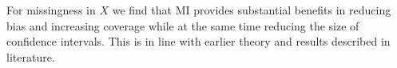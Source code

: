 \documentclass{article}
\begin{document}
	For missingness in $X$ we find that MI provides substantial benefits in reducing bias and increasing coverage while at the same time reducing the size of confidence intervals. This is in line with earlier theory and results described in literature.
	
	\begin{figure}[H]
		\centering
		\quad
		\\
		\quad

\end{figure}
\end{document}
